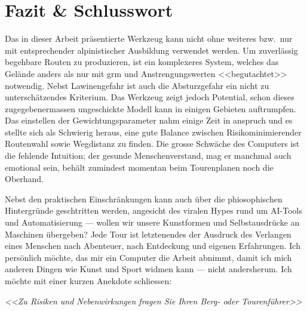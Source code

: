 \section{Fazit \& Schlusswort}

Das in dieser Arbeit präsentierte Werkzeug kann nicht ohne weiteres bzw.\ nur mit entsprechender alpinistischer Ausbildung verwendet werden. Um zuverlässig begehbare Routen zu produzieren, ist ein komplexeres System, welches das Gelände anders als nur mit \gls{grm} und Anstrengungswerten <<begutachtet>> notwendig. Nebst Lawinengefahr ist auch die Absturzgefahr ein nicht zu unterschätzendes Kriterium. Das Werkzeug zeigt jedoch Potential, schon dieses zugegebenermassen ungeschickte Modell kann in einigen Gebieten auftrumpfen. Das einstellen der Gewichtungsparameter nahm einige Zeit in anspruch und es stellte sich als Schwierig heraus, eine gute Balance zwischen Risikominimierender Routenwahl sowie Wegdistanz zu finden. Die grosse Schwäche des Computers ist die fehlende Intuition; der gesunde Menschenverstand, mag er manchmal auch emotional sein, behält zumindest momentan beim Tourenplanen noch die Oberhand. 

Nebst den praktischen Einschränkungen kann auch über die phiosophischen Hintergründe geschtritten werden, angesicht des viralen Hypes rund um AI-Tools und Automatisierung --- wollen wir unsere Kunstformen und Selbstausdrücke an Maschinen übergeben? Jede Tour ist letztenendes der Ausdruck des Verlangen eines Menschen nach Abenteuer, nach Entdeckung und eigenen Erfahrungen. Ich persönlich möchte, das mir ein Computer die Arbeit abnimmt, damit ich mich anderen Dingen wie Kunst und Sport widmen kann --- nicht andersherum. Ich möchte mit einer kurzen Anekdote schliessen:

\large{
  \textit{<<Zu Risiken und Nebenwirkungen fragen Sie Ihren Berg- oder Tourenführer>>}
}
